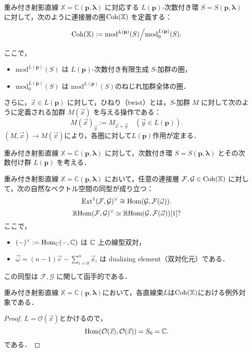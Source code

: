 \begin{defn}\cite{GL87}
重み付き射影直線 $\mathbb{X} = \mathbb{C}(\mathbf{p}, \boldsymbol{\lambda})$ に対応する $L(\mathbf{p})$-次数付き環 $S = S(\mathbf{p}, \boldsymbol{\lambda})$ に対して，次のように連接層の圏$\operatorname{\mathrm{Coh}}(\mathbb{X})$ を定義する：

\[
\operatorname{\mathrm{Coh}}(\mathbb{X}) := \mathrm{mod}^{L(\mathbf{p})}(S)\Big{/}\mathrm{mod}^{L(\mathbf{p})}_0(S).
\]

ここで，
\begin{itemize}
  \item $\mathrm{mod}^{L(\mathbf{p})}(S)$ は $L(\mathbf{p})$-次数付き有限生成 $S$-加群の圏，
	\item $\mathrm{mod}^{L(\mathbf{p})}_0(S)$ は $\mathrm{mod}^{L(\mathbf{p})}(S)$のねじれ加群全体の圏．
\end{itemize}
さらに，$\vec{x} \in L(\mathbf{p})$ に対して，ひねり（twist）とは，$S$-加群 $M$ に対して次のように定義される加群 $M(\vec{x})$ を与える操作である：
\[
M(\vec{x})_{\vec{y}} := M_{\vec{x} + \vec{y}} \quad (\vec{y} \in L(\mathbf{p})).
\]
$(M,\vec{x})\to M(\vec{x})$により，各圏に対して$L(\mathbf{p})$作用が定まる．
\end{defn}

\begin{defn}[局所化]
重み付き射影直線 $\mathbb{X} = \mathbb{C}(\mathbf{p}, \boldsymbol{\lambda})$ に対して，次数付き環 $S = S(\mathbf{p}, \boldsymbol{\lambda})$ とその次数付け群 $L(\mathbf{p})$ を考える．

\end{defn}

\begin{thm}\cite{GL87}
重み付き射影直線 $\mathbb{X} = \mathbb{C}(\mathbf{p}, \boldsymbol{\lambda})$ において，任意の連接層 $\mathcal{F}, \mathcal{G} \in \operatorname{\mathrm{Coh}}(\mathbb{X})$ に対して，次の自然なベクトル空間の同型が成り立つ：
\[
\operatorname{\mathrm{Ext}}^1(\mathcal{F}, \mathcal{G})^\vee \cong \operatorname{\mathrm{Hom}}(\mathcal{G}, \mathcal{F}(\vec{\omega})).
\]
\[
\operatorname{\mathbb{R}\mathrm{Hom}}({\mathcal F},{\mathcal G})^\vee \simeq \operatorname{\mathbb{R}\mathrm{Hom}}({\mathcal G},{\mathcal F}(\vec{\omega}))[1]?\]
ここで，
\begin{itemize}
	\item $(-)^\vee := \operatorname{\mathrm{Hom}}_{{\mathbb C}}(-, {\mathbb C})$ は ${\mathbb C}$ 上の線型双対，
  \item $\vec{\omega} = (n - 1)\vec{c} - \sum_{i=0}^n \vec{x}_i$ は dualizing element（双対化元）である．
\end{itemize}
この同型は $\mathcal{F}, \mathcal{G}$ に関して函手的である．
\end{thm}

\begin{lemm}
	重み付き射影直線 $\mathbb{X} = \mathbb{C}(\mathbf{p}, \boldsymbol{\lambda})$において，各直線束$L$は$\operatorname{\mathrm{Coh}}({\mathbb X})$における例外対象である．
\end{lemm}
\begin{proof}
	$L = \mathcal{O}(\vec{x})$とかけるので，
	\[\operatorname{\mathrm{Hom}}(\mathcal{O}(\vec{x}),\mathcal{O}(\vec{x}))=S_0={\mathbb C}.\]
	である．
\end{proof}

